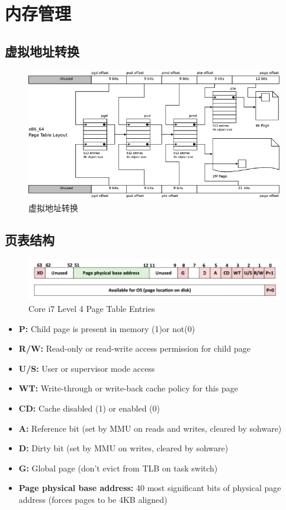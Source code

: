\chapter{内存管理}



\section{虚拟地址转换}


\begin{figure}[htbp]
\centering \includegraphics[width=1\textwidth]{va-to-pa.png}
\caption{虚拟地址转换\cite{linuxmm}}
\end{figure}

\section{页表结构}

\begin{figure}[htbp]
\centering \includegraphics[width=1\textwidth]{pte.png}
\caption{Core i7 Level 4 Page Table	Entries}
\end{figure}

\begin{itemize}
\item \textbf{P:} Child page is present in memory (1)or not(0)	
\item \textbf{R/W:} Read-only or read-write access permission for child page	
\item \textbf{U/S:} User or	supervisor mode	access	
\item \textbf{WT:} Write-through or	write-back cache policy for this page	
\item \textbf{CD:} Cache disabled (1) or	enabled (0)	
\item \textbf{A:} Reference bit (set by MMU on reads and	writes, cleared	by sohware)		
\item \textbf{D:} Dirty bit (set	by MMU on writes, cleared by sohware)	
\item \textbf{G:} Global	page (don’t	evict from TLB on task switch)	
\item \textbf{Page physical base address:} 40 most significant bits of physical page address (forces pages to be	4KB	aligned)	
\end{itemize}
